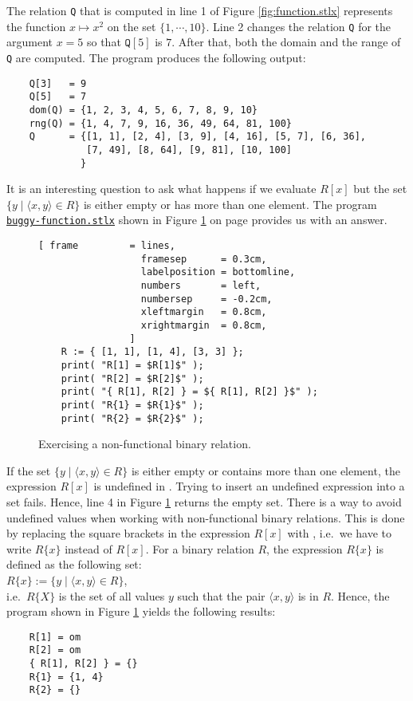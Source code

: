 The relation \texttt{Q} that is computed in line 1 of Figure \ref{fig:function.stlx} represents the
function $x \mapsto x^2$ on the set $\{ 1, \cdots, 10 \}$.  
Line 2 changes the relation \texttt{Q} for the argument $x=5$ so that  $\mathtt{Q}[5]$ is
$7$.   After that, both the domain and the range of \texttt{Q} are computed.
The program produces the following output:
\begin{verbatim}
    Q[3]   = 9
    Q[5]   = 7
    dom(Q) = {1, 2, 3, 4, 5, 6, 7, 8, 9, 10}
    rng(Q) = {1, 4, 7, 9, 16, 36, 49, 64, 81, 100}
    Q      = {[1, 1], [2, 4], [3, 9], [4, 16], [5, 7], [6, 36], 
              [7, 49], [8, 64], [9, 81], [10, 100]
             }
\end{verbatim}
It is an  interesting question to ask what happens if we evaluate $R[x]$ but the set 
 $\{ y \mid \langle x, y \rangle \in R \}$ is either empty or has more than one element.
The program 
\href{https://github.com/karlstroetmann/Logik/blob/master/SetlX/buggy-function.stlx}{\texttt{buggy-function.stlx}}
shown in Figure
\ref{fig:buggy-function.stlx} on page \pageref{fig:buggy-function.stlx} provides us with an answer.


\begin{figure}[!ht]
  \centering
\begin{Verbatim}[ frame         = lines, 
                  framesep      = 0.3cm, 
                  labelposition = bottomline,
                  numbers       = left,
                  numbersep     = -0.2cm,
                  xleftmargin   = 0.8cm,
                  xrightmargin  = 0.8cm,
                ]
    R := { [1, 1], [1, 4], [3, 3] };
    print( "R[1] = $R[1]$" );
    print( "R[2] = $R[2]$" );
    print( "{ R[1], R[2] } = ${ R[1], R[2] }$" );
    print( "R{1} = $R{1}$" );
    print( "R{2} = $R{2}$" );
\end{Verbatim} 
\vspace*{-0.3cm}
\caption{Exercising a non-functional binary relation.}  \label{fig:buggy-function.stlx}
\end{figure} 

If the set  $\{ y \mid \langle x, y \rangle \in R \}$ is either empty or contains more than one
element, the expression $R[x]$ is undefined in \setlx.  Trying to insert an undefined expression
into a set fails.  Hence, line 4 in Figure \ref{fig:buggy-function.stlx} returns the empty set.
There is a way to avoid undefined values when working with non-functional binary relations.
This is done by replacing the square brackets in the expression $R[x]$ with , i.e.~we
have to write $R\{x\}$ instead of $R[x]$.
For a binary relation $R$, the expression  $R\{x\}$  is defined as the following set:
\\[0.2cm]
\hspace*{1.3cm}
 $R\{x\} := \{ y \mid \langle x, y \rangle \in R \}$,
\\[0.2cm]
i.e.~$R\{X\}$ is the set of all values $y$ such that the pair $\langle x, y \rangle$ is in $R$.
Hence, the program shown in Figure  \ref{fig:buggy-function.stlx} yields the following results:
\begin{verbatim}
    R[1] = om
    R[2] = om
    { R[1], R[2] } = {}
    R{1} = {1, 4}
    R{2} = {}
\end{verbatim}

